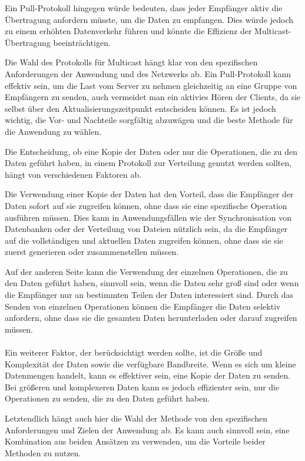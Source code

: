 Ein Pull-Protokoll hingegen würde bedeuten, dass jeder Empfänger aktiv die Übertragung anfordern müsste, um die Daten zu empfangen. Dies würde jedoch zu einem erhöhten Datenverkehr führen und könnte die Effizienz der Multicast-Übertragung beeinträchtigen.

Die Wahl des Protokolls für Multicast hängt klar von den spezifischen Anforderungen der Anwendung und des Netzwerks ab. Ein Pull-Protokoll kann effektiv sein, um die Last vom Server zu nehmen gleichzeitig an eine Gruppe von Empfängern zu senden, auch vermeidet man ein aktivies Hören der Clients, da sie selbst über den Aktualisierungszeitpunkt entscheiden können. Es ist jedoch wichtig, die Vor- und Nachteile sorgfältig abzuwägen und die beste Methode für die Anwendung zu wählen.

Die Entscheidung, ob eine Kopie der Daten oder nur die Operationen, die zu den Daten geführt haben, in einem Protokoll zur Verteilung genutzt werden sollten, hängt von verschiedenen Faktoren ab.

Die Verwendung einer Kopie der Daten hat den Vorteil, dass die Empfänger der Daten sofort auf sie zugreifen können, ohne dass sie eine spezifische Operation ausführen müssen. Dies kann in Anwendungsfällen wie der Synchronisation von Datenbanken oder der Verteilung von Dateien nützlich sein, da die Empfänger auf die vollständigen und aktuellen Daten zugreifen können, ohne dass sie sie zuerst generieren oder zusammenstellen müssen.

Auf der anderen Seite kann die Verwendung der einzelnen Operationen, die zu den Daten geführt haben, sinnvoll sein, wenn die Daten sehr groß sind oder wenn die Empfänger nur an bestimmten Teilen der Daten interessiert sind. Durch das Senden von einzelnen Operationen können die Empfänger die Daten selektiv anfordern, ohne dass sie die gesamten Daten herunterladen oder darauf zugreifen müssen.
\\\\
Ein weiterer Faktor, der berücksichtigt werden sollte, ist die Größe und Komplexität der Daten sowie die verfügbare Bandbreite. Wenn es sich um kleine Datenmengen handelt, kann es effektiver sein, eine Kopie der Daten zu senden. Bei größeren und komplexeren Daten kann es jedoch effizienter sein, nur die Operationen zu senden, die zu den Daten geführt haben.

Letztendlich hängt auch hier die Wahl der Methode von den spezifischen Anforderungen und Zielen der Anwendung ab. Es kann auch sinnvoll sein, eine Kombination aus beiden Ansätzen zu verwenden, um die Vorteile beider Methoden zu nutzen.


